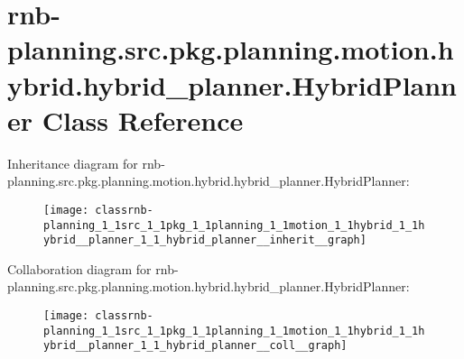 \hypertarget{classrnb-planning_1_1src_1_1pkg_1_1planning_1_1motion_1_1hybrid_1_1hybrid__planner_1_1_hybrid_planner}{}\section{rnb-\/planning.src.\+pkg.\+planning.\+motion.\+hybrid.\+hybrid\+\_\+planner.\+Hybrid\+Planner Class Reference}
\label{classrnb-planning_1_1src_1_1pkg_1_1planning_1_1motion_1_1hybrid_1_1hybrid__planner_1_1_hybrid_planner}


Inheritance diagram for rnb-\/planning.src.\+pkg.\+planning.\+motion.\+hybrid.\+hybrid\+\_\+planner.\+Hybrid\+Planner\+:
\nopagebreak
\begin{figure}[H]
\begin{center}
\leavevmode
\texttt{[image: classrnb-planning\_1\_1src\_1\_1pkg\_1\_1planning\_1\_1motion\_1\_1hybrid\_1\_1hybrid\_\_planner\_1\_1\_hybrid\_planner\_\_inherit\_\_graph]}
\end{center}
\end{figure}


Collaboration diagram for rnb-\/planning.src.\+pkg.\+planning.\+motion.\+hybrid.\+hybrid\+\_\+planner.\+Hybrid\+Planner\+:
\nopagebreak
\begin{figure}[H]
\begin{center}
\leavevmode
\texttt{[image: classrnb-planning\_1\_1src\_1\_1pkg\_1\_1planning\_1\_1motion\_1\_1hybrid\_1\_1hybrid\_\_planner\_1\_1\_hybrid\_planner\_\_coll\_\_graph]}
\end{center}
\end{figure}

